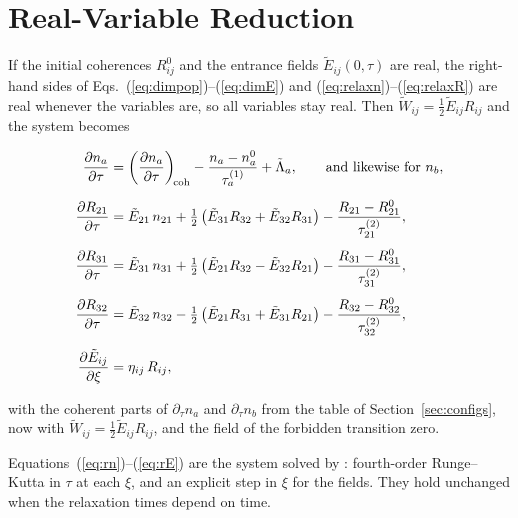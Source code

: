 \documentclass[12pt,a4paper]{article}
\newcommand{\tE}{\tilde{E}}
\newcommand{\tW}{\tilde{W}}
\begin{document}
\section{Real-Variable Reduction}
\label{subsec:real}

If the initial coherences $R_{ij}^0$ and the entrance fields
$\tE_{ij}(0,\tau)$ are real, the right-hand sides of
Eqs.~(\ref{eq:dimpop})--(\ref{eq:dimE}) and
(\ref{eq:relaxn})--(\ref{eq:relaxR}) are real whenever the variables are, so
all variables stay real. Then $\tW_{ij} = \tfrac12\tE_{ij}R_{ij}$ and the
system becomes

\begin{resultbox}
\begin{align}
  \pderiv{n_a}{\tau} &= \left(\pderiv{n_a}{\tau}\right)_{\!\text{coh}}
     - \frac{n_a - n_a^0}{\tau_a^{(1)}} + \tilde{\Lambda}_a,
  \qquad \text{and likewise for } n_b,
  \label{eq:rn}\\[6pt]
  \pderiv{R_{21}}{\tau} &= \tE_{21}\,n_{21}
     + \tfrac12\left(\tE_{31}R_{32} + \tE_{32}R_{31}\right)
     - \frac{R_{21} - R_{21}^0}{\tau_{21}^{(2)}},\\[4pt]
  \pderiv{R_{31}}{\tau} &= \tE_{31}\,n_{31}
     + \tfrac12\left(\tE_{21}R_{32} - \tE_{32}R_{21}\right)
     - \frac{R_{31} - R_{31}^0}{\tau_{31}^{(2)}},\\[4pt]
  \pderiv{R_{32}}{\tau} &= \tE_{32}\,n_{32}
     - \tfrac12\left(\tE_{21}R_{31} + \tE_{31}R_{21}\right)
     - \frac{R_{32} - R_{32}^0}{\tau_{32}^{(2)}},\\[6pt]
  \pderiv{\tE_{ij}}{\xi} &= \eta_{ij}\,R_{ij},
  \label{eq:rE}
\end{align}
\end{resultbox}

with the coherent parts of $\partial_\tau n_a$ and $\partial_\tau n_b$ from
the table of Section~\ref{sec:configs}, now with
$\tW_{ij} = \tfrac12\tE_{ij}R_{ij}$, and the field of the forbidden transition
zero.

\begin{notebox}
  Equations~(\ref{eq:rn})--(\ref{eq:rE}) are the system solved by
  : fourth-order Runge--Kutta in
  $\tau$ at each $\xi$, and an explicit step in $\xi$ for the fields. They
  hold unchanged when the relaxation times depend on time.
\end{notebox}

\end{document}
